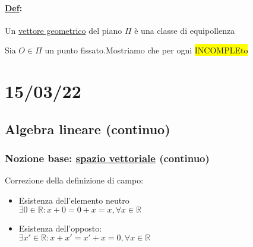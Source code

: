 \documentclass{article}
\newcommand{\hl}[1]{\colorbox{yellow}{#1}}
\newcommand{\ul}[1]{\underline{#1}}
\newcommand{\R}{\mathbb{R}}
\newcommand{\Def}[2]{\paragraph{\ul{Def}:}#1\\\hspace*{3em}\begin{minipage}{.8\textwidth}#2\end{minipage}}
\begin{document}
\Def{Un \ul{vettore geometrico} del piano $\Pi$ è una classe di equipollenza}
{Sia $O\in\Pi$ un punto fissato.Mostriamo che per ogni \hl{INCOMPLEto}}
\section{15/03/22}
\subsection{Algebra lineare (continuo)}
\subsubsection*{Nozione base: \ul{spazio vettoriale} (continuo)}
Correzione della definizione di campo:
\begin{itemize}
	\item Esistenza dell'elemento neutro\\$\exists0\in\R:x+0=0+x=x,\forall x\in\R$
	\item Esistenza dell'opposto:\\$\exists x'\in\R:x+x'=x'+x=0,\forall x\in\R$
\end{itemize}
\hrulefill
\end{document}
